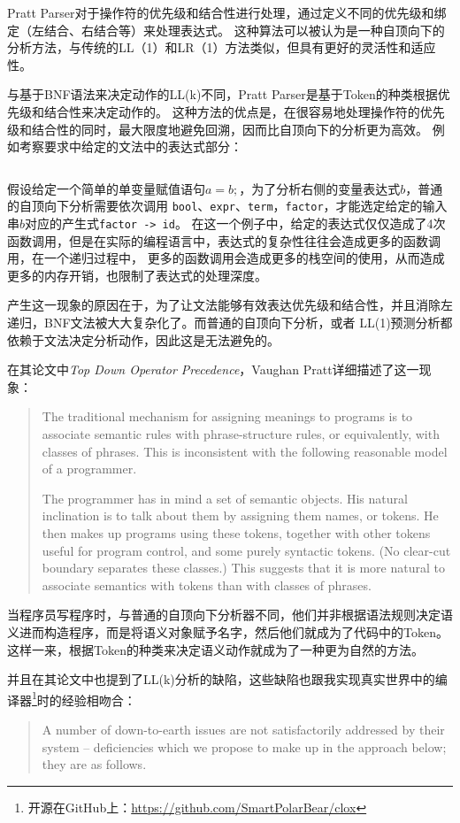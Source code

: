 \documentclass[a4paper,twoside]{article}
\begin{document}
\begin{spacing}{1.2}
Pratt Parser对于操作符的优先级和结合性进行处理，通过定义不同的优先级和绑定（左结合、右结合等）来处理表达式。
这种算法可以被认为是一种自顶向下的分析方法，与传统的LL（1）和LR（1）方法类似，但具有更好的灵活性和适应性。

与基于BNF语法来决定动作的LL(k)不同，Pratt Parser是基于Token的种类根据优先级和结合性来决定动作的。
这种方法的优点是，在很容易地处理操作符的优先级和结合性的同时，最大限度地避免回溯，因而比自顶向下的分析更为高效。
例如考察要求中给定的文法中的表达式部分：
\inputminted{bnf}{text/grammar.txt}
假设给定一个简单的单变量赋值语句$a=b;$，为了分析右侧的变量表达式$b$，普通的自顶向下分析需要依次调用
\texttt{bool}、\texttt{expr}、\texttt{term}，\texttt{factor}，才能选定给定的输入串$b$对应的产生式\texttt{factor -> id}。
在这一个例子中，给定的表达式仅仅造成了4次函数调用，但是在实际的编程语言中，表达式的复杂性往往会造成更多的函数调用，在一个递归过程中，
更多的函数调用会造成更多的栈空间的使用，从而造成更多的内存开销，也限制了表达式的处理深度。

产生这一现象的原因在于，为了让文法能够有效表达优先级和结合性，并且消除左递归，BNF文法被大大复杂化了。而普通的自顶向下分析，或者
LL(1)预测分析都依赖于文法决定分析动作，因此这是无法避免的。

在其论文中\emph{Top Down Operator Precedence}，Vaughan Pratt详细描述了这一现象：
\begin{quotation}
The traditional mechanism for assigning meanings to programs is to associate semantic rules with phrase-structure rules, or equivalently, with classes of phrases. This is inconsistent with the following reasonable model of a programmer.

The programmer has in mind a set of semantic objects. His natural inclination is to talk about them by assigning them names, or tokens. He then makes up programs using these tokens, together with other tokens useful for program control, and some purely syntactic tokens. (No clear-cut boundary separates these classes.) This suggests that it is more natural to associate semantics with tokens than with classes of phrases.
\end{quotation}
当程序员写程序时，与普通的自顶向下分析器不同，他们并非根据语法规则决定语义进而构造程序，而是将语义对象赋予名字，然后他们就成为了代码中的Token。
这样一来，根据Token的种类来决定语义动作就成为了一种更为自然的方法。

并且在其论文中也提到了LL(k)分析的缺陷，这些缺陷也跟我实现真实世界中的编译器\footnote{开源在GitHub上：\url{https://github.com/SmartPolarBear/clox}}时的经验相吻合：
\begin{quotation}
A number of down-to-earth issues are not satisfactorily addressed by their system – deficiencies which we propose to make up in the approach below; they are as follows.


\end{quotation}
\end{spacing}
\end{document}
